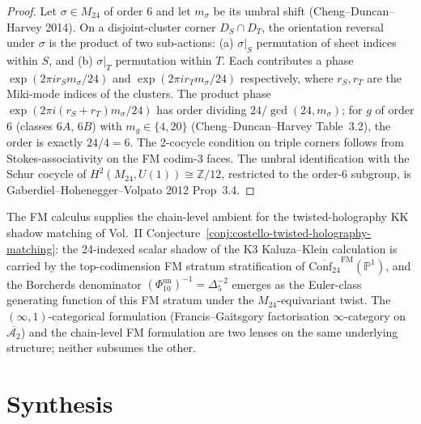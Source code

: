 \begin{proof}
Let $\sigma\in M_{24}$ of order 6 and let $m_\sigma$ be its
umbral shift (Cheng--Duncan--Harvey 2014). On a disjoint-cluster
corner $D_S\cap D_T$, the orientation reversal under
$\sigma$ is the product of two sub-actions: (a)
$\sigma|_S$ permutation of sheet indices within $S$, and (b)
$\sigma|_T$ permutation within $T$. Each contributes a phase
$\exp(2\pi i r_S m_\sigma/24)$ and $\exp(2\pi i r_T m_\sigma/24)$
respectively, where $r_S,r_T$ are the Miki-mode indices of the
clusters. The product phase
$\exp(2\pi i (r_S+r_T) m_\sigma/24)$ has order dividing
$24/\gcd(24, m_\sigma)$; for $g$ of order 6 (classes $6A$, $6B$)
with $m_g \in \{4,20\}$ (Cheng--Duncan--Harvey Table~3.2), the
order is exactly $24/4 = 6$. The 2-cocycle condition on
triple corners follows from Stokes-associativity on the FM
codim-3 faces. The umbral identification with the Schur cocycle
of $H^2(M_{24}, U(1)) \cong \mathbb Z/12$, restricted to the
order-6 subgroup, is Gaberdiel--Hohenegger--Volpato 2012
Prop~3.4.
\end{proof}

\begin{remark}
\label{rem:fm-chain-level-twisted-holography}
The FM calculus supplies the chain-level ambient for the
twisted-holography KK shadow matching of Vol.~II
Conjecture~\ref{conj:costello-twisted-holography-matching}:
the 24-indexed scalar shadow of the K3 Kaluza--Klein calculation is
carried by the top-codimension
FM stratum stratification of $\overline{\mathrm{Conf}_{24}}^{\mathrm{FM}}(\mathbb{P}^1)$,
and the Borcherds denominator $(\Phi_{10}^{\mathrm{un}})^{-1} = \Delta_5^{-2}$
emerges as the Euler-class generating function of this FM
stratum under the $M_{24}$-equivariant twist. The
$(\infty,1)$-categorical formulation (Francis--Gaitsgory
factorisation $\infty$-category on
$\overline{\mathcal A_2}$) and the chain-level FM formulation
are two lenses on the same underlying structure; neither
subsumes the other.
\end{remark}

\section{Synthesis}
\label{sec:fmc-supplement}

